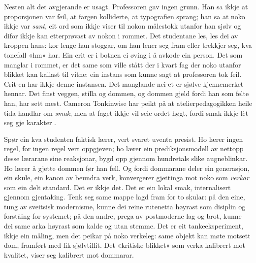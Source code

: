 Nesten alt det avgjerande er usagt. Professoren gav ingen grunn. Han sa ikkje at proporsjonen var feil, at fargen kolliderte, at typografien sprang; han sa at noko ikkje var \emph{sant}, eit ord som ikkje viser til nokon målestokk utanfor han sjølv og difor ikkje kan etterprøvast av nokon i rommet. Det studentane les, les dei av kroppen hans: kor lenge han stoggar, om han lener seg fram eller trekkjer seg, kva tonefall «hm» har. Ein crit er i botnen ei øving i å avkode ein person. Det som manglar i rommet, er det same som ville stått der i kvart fag der noko utanfor blikket kan kallast til vitne: ein instans som kunne sagt at professoren tok feil. Crit-en har ikkje denne instansen. Det manglande nei-et er sjølve kjennemerket hennar. Det finst veggen, stilla og dommen, og dommen gjeld fordi han som felte han, har sett mest. Cameron Tonkinwise har peikt på at atelierpedagogikken heile tida handlar om \emph{smak}, men at faget ikkje vil seie ordet høgt, fordi smak ikkje lèt seg gje karakter \autocite{tonkinwise2011}.

Spør ein kva studenten faktisk lærer, vert svaret uventa presist. Ho lærer ingen regel, for ingen regel vert oppgjeven; ho lærer ein prediksjonsmodell av nettopp desse lærarane sine reaksjonar, bygd opp gjennom hundretals slike augneblinkar. Ho lærer å gjette dommen før han fell. Og fordi dommarane deler ein generasjon, ein skule, ein kanon av beundra verk, konvergerer gjettinga mot noko som \emph{verkar} som ein delt standard. Det er ikkje det. Det er ein lokal smak, internalisert gjennom gjentaking. Tenk seg same mappe lagd fram for to skular: på den eine, tung av sveitsisk modernisme, kunne dei reine rutenetta høyrast som disiplin og forståing for systemet; på den andre, prega av postmoderne lag og brot, kunne dei same arka høyrast som kalde og utan stemme. Det er eit tankeeksperiment, ikkje ein måling, men det peikar på noko verkeleg: same objekt kan møte motsett dom, framført med lik sjølvtillit. Det «kritiske blikket» som verka kalibrert mot kvalitet, viser seg kalibrert mot dommarar.

